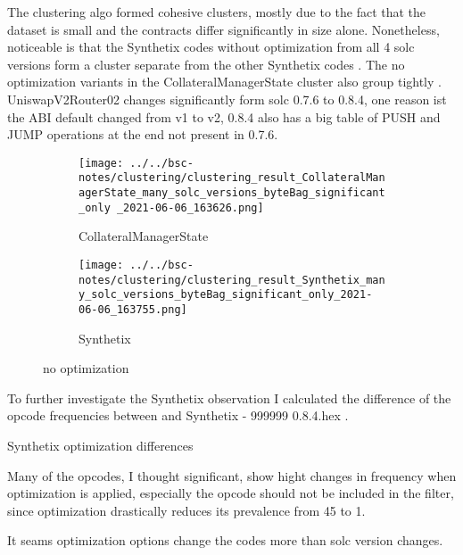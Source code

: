 \documentclass[../main.tex]{subfiles}
\begin{document}
The clustering algo formed cohesive clusters, mostly due to the fact that the dataset is small and the contracts differ significantly in size alone.
Nonetheless, noticeable is that the Synthetix codes without optimization from all 4 solc versions form a cluster separate from the other Synthetix codes . The no optimization variants in the CollateralManagerState cluster also group tightly .
UniswapV2Router02 changes significantly form solc 0.7.6 to 0.8.4, one reason ist the ABI default changed from v1 to v2, 0.8.4 also has a big table of PUSH and JUMP operations at the end not present in 0.7.6.

\begin{figure}[ht!]
  \begin{subfigure}[b]{0.5 \linewidth}
    \texttt{[image: ../../bsc-notes/clustering/clustering\_result\_CollateralManagerState\_many\_solc\_versions\_byteBag\_significant\_only \_2021-06-06\_163626.png]}%
    \caption{CollateralManagerState}
    \label{fig:CollateralManagerState}
  \end{subfigure}%
  \begin{subfigure}[b]{0.5 \linewidth}
    \texttt{[image: ../../bsc-notes/clustering/clustering\_result\_Synthetix\_many\_solc\_versions\_byteBag\_significant\_only\_2021-06-06\_163755.png]}
    \caption{Synthetix}
    \label{fig:Synthetix}
  \end{subfigure}
  \caption{no optimization}
\end{figure}

To further investigate the Synthetix observation I calculated the difference of the opcode frequencies between  and {Synthetix - 999999 0.8.4.hex} .

\begin{table}[ht!]
  \centering
  \scriptsize
  \caption{Synthetix optimization differences}
  \label{tbl:opt_diff}
\end{table}

Many of the opcodes, I thought significant, show hight changes in frequency when optimization is applied, especially the  opcode should not be included in the filter, since optimization drastically reduces its prevalence from 45 to 1.

It seams optimization options change the codes more than solc version changes.
\end{document}
